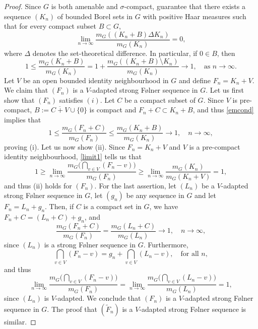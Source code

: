 \documentclass[12pt,reqno,a4paper]{amsart}
\numberwithin{equation}{section}
\newcommand{\ra}{\rightarrow}
\theoremstyle{theorem}
\theoremstyle{task}
\theoremstyle{definition}
\begin{document}
\begin{proof}
Since $G$ is both amenable and $\sigma$-compact, 
\cite[Theorem 4 and Proposition 1]{Emerson} guarantee that there exists a 
sequence $(K_n)$ of bounded Borel sets in $G$ with positive Haar measures 
such that
for every compact subset $B \subset G$, 
\begin{equation}
\label{emcond}
\lim_{n \ra \infty} \frac{m_G((K_n+B) \Delta K_n)}{m_G(K_n)} = 0,
\end{equation}
where $\Delta$ denotes the set-theoretical difference. In particular, if $0 \in B$,
then
\begin{equation}
\label{limit1}
1 \leq \frac{m_G(K_n + B)}{m_G(K_n)} = 1 + \frac{m_G((K_n + B) \setminus K_n)}{m_G(K_n)} \ra 1, \quad \textrm{as $n \ra \infty$}.
\end{equation}
Let $V$ be an open bounded identity neighbourhood in $G$ and define $F_n = K_n + V$. We claim 
that $(F_n)$ is a $V$-adapted strong F\o lner sequence in $G$. Let us first show
that $(F_n)$ satisfies $(i)$. Let $C$ be a compact subset of $G$. Since 
$V$ is pre-compact, $B := \overline{C + V} \cup \{0\}$ is compact and $F_n + C \subset K_n + B$, and thus \eqref{emcond} implies that
\[
1 \leq \frac{m_G(F_n + C)}{m_G(F_n)} \leq \frac{m_G(K_n + B)}{m_G(K_n)} \ra 1, \quad n \ra \infty,
\]
proving (i). Let us now show (ii). Since $F_n = K_n + V$ and $V$ is a pre-compact identity neighbourhood, \eqref{limit1} tells us that
\[
1 \geq \lim_{n \ra \infty} 
\frac{m_G\big( \bigcap_{v \in V} (F_n-v) \big)}{m_G(F_n)} \geq \lim_{n \ra \infty} \frac{m_G(K_n)}{m_G(K_n + V)} = 1,
\]
and thus (ii) holds for $(F_n)$. For the last assertion, let $(L_n)$ be a $V$-adapted strong F\o lner sequence in $G$, let $(g_n)$ be any sequence in $G$ and let $F_n = L_n + g_n$. Then, if $C$ is a compact set in $G$, we have $F_n + C = (L_n + C) + g_n$, and 
\[
\frac{m_G(F_n + C)}{m_G(F_n)} = \frac{m_G(L_n + C)}{m_G(L_n)} \ra 1, \quad n \ra \infty,
\]
since $(L_n)$ is a strong F\o lner sequence in $G$.
Furthermore, 
\[
\bigcap_{v \in V} (F_n - v) = g_n + \bigcap_{v \in V} (L_n - v), \quad \textrm{for all $n$},
\]
and thus
\[
\lim_{n \ra \infty} \frac{m_G\big( \bigcap_{v \in V} (F_n-v) \big)}{m_G(F_n)}
=
\lim_{n \ra \infty} \frac{m_G\big( \bigcap_{v \in V} (L_n-v) \big)}{m_G(L_n)} = 1,
\]
since $(L_n)$ is $V$-adapted. We conclude that $(F_n)$ is a $V$-adapted strong F\o lner sequence in $G$. The proof that $(\widetilde{F}_n)$ is a $V$-adapted strong F\o lner sequence is similar.
\end{proof}
\end{document}
